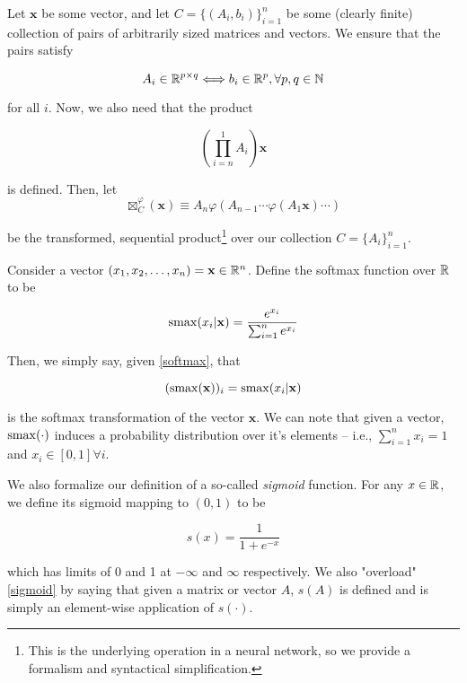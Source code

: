 Let $\mathbf{x}$ be some vector, and let $C=\{ (A_i,b_i) \}_{i=1}^{n}$ be some (clearly finite) collection of pairs of arbitrarily sized matrices and vectors. We ensure that the pairs satisfy

\begin{equation}
\label{condition on dimensions}
A_i \in\mathbb{R}^{p\times q} \Longleftrightarrow b_i\in\mathbb{R}^{p}, \forall p,q\in\mathbb{N}
\end{equation}

for all $i$. Now, we also need that the product

\begin{equation}
\label{condition on product}
(\prod_{i=n}^{1} A_i ) \mathbf{x}
\end{equation}


is defined. Then, let
\begin{equation}
\label{network_operator}
\boxtimes_{C}^{\varphi} ( \mathbf{x} ) \equiv  A_n \varphi( A_{n-1}\cdots \varphi(A_1 \mathbf{x}) \cdots )
\end{equation}


be the transformed, sequential product\footnote{This is the underlying operation in a neural network, so we provide a formalism and syntactical simplification.} over our collection $C=\{ A_i \}_{i=1}^{n}$. 

Consider a vector $(x_1,x_2,\ldots,x_n)=\mathbf{x}\in\mathbb{R}^{n}$. Define the softmax function over $\mathbb{R}$ to be 


\begin{equation}
\label{softmax}
\mathrm{smax}(x_i | \mathbf{x}) = \frac{e^{x_i}}{ \sum_{i = 1}^{n} e^{x_i} }
\end{equation}

Then, we simply say, given \eqref{softmax}, that 

$$ (\mathrm{smax}(\mathbf{x}))_i =  \mathrm{smax}(x_i | \mathbf{x})  $$

is the softmax transformation of the vector $\mathbf{x}$. We can note that given a vector, $\mathrm{smax}(\cdot)$ induces a probability distribution over it's elements -- i.e., $\sum_{i=1}^{n}x_i = 1$ and $x_i\in[0,1]\forall i$.

We also formalize our definition of a so-called \emph{sigmoid} function. For any $x\in\mathbb{R}$, we define its sigmoid mapping to $(0,1)$ to be 

\begin{equation}
\label{sigmoid}
s(x) = \frac{1}{1+e^{-x}}
\end{equation}

which has limits of 0 and 1 at $-\infty$ and $\infty$ respectively. We also "overload" \eqref{sigmoid} by saying that given a matrix or vector $A$, $s(A)$ is defined and is simply an element-wise application of $s(\cdot)$.

